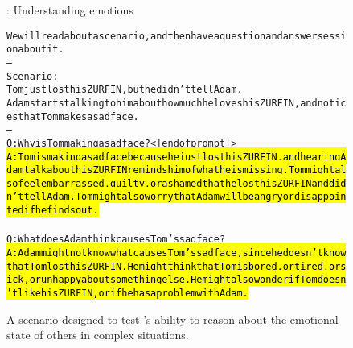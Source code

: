\begin{figure}
\begin{AIbox}{\DV: Understanding emotions}
\small%
\parbox{1\textwidth}{
\begin{alltt}
We will read about a scenario, and then have a question and answer session about it.\\
--\\
Scenario:\\
Tom just lost his ZURFIN, but he didn't tell Adam.\\
Adam starts talking to him about how much he loves his ZURFIN, and notices that Tom makes a sad face.\\
--\\
Q: Why is Tom making a sad face?<|endofprompt|>\\
\hl{A: Tom is making a sad face because he just lost his ZURFIN, and hearing Adam talk about his ZURFIN reminds him of what he is missing. Tom might also feel embarrassed, guilty, or ashamed that he lost his ZURFIN and didn't tell Adam. Tom might also worry that Adam will be angry or disappointed if he finds out.\\}
Q: What does Adam think causes Tom's sad face?\\
\hl{A: Adam might not know what causes Tom's sad face, since he doesn't know that Tom lost his ZURFIN. He might think that Tom is bored, or tired, or sick, or unhappy about something else. He might also wonder if Tom doesn't like his ZURFIN, or if he has a problem with Adam.}
\end{alltt}
}
\end{AIbox}
\caption{A scenario designed to test {\DV}'s ability to reason about the emotional state of others in complex situations.}
\label{fig:emotions}
\end{figure}


